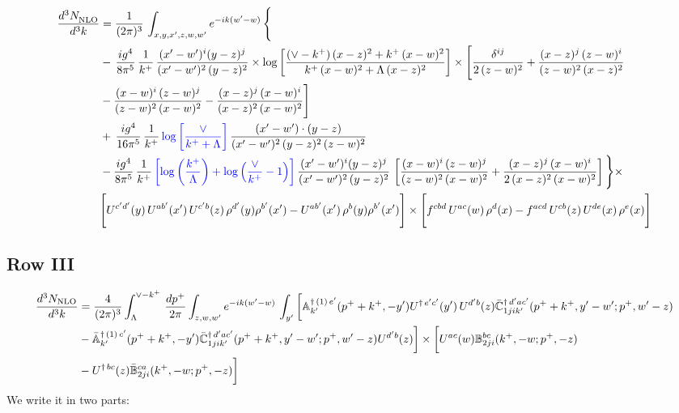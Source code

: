 \documentclass[9pt]{article}
\def\mf#1{\mathbb{#1}}
\numberwithin{equation}{section}
\begin{document}
\begin{align}
     \frac{d^{3}N_{\rm NLO}^{\rm}}{d^{3}k}  & =  \frac{1}{(2\pi)^{3}}\, \int_{x,y,x',z,w,w^{\prime}} e^{-ik(w^{\prime}-w)}\, \Bigg\{\notag \\ & -\,\frac{ig^{4}}{8\pi^{5}}\,\frac{1}{k^{+}}\,\frac{(x'-w')^{i}(y-z)^{j}}{(x'-w')^{2}\,(y-z)^{2}}\times \log{\left[\frac{(\vee-k^{+})\,(x-z)^{2}+k^{+}\,(x-w)^{2}}{k^{+}\,(x-w)^{2}+\Lambda\, (x-z)^{2}}\right]}\times \Bigg[\frac{\delta^{ij}}{2\,(z-w)^{2}}+\frac{(x-z)^{j}\,(z-w)^{i}}{(z-w)^{2}\,(x-z)^{2}}\notag \\ & -\frac{(x-w)^{i}\,(z-w)^{j}}{(z-w)^{2}\,(x-w)^{2}}-\frac{(x-z)^{j}\,(x-w)^{i}}{(x-z)^{2}\,(x-w)^{2}}\Bigg]\notag \\ & +\,\frac{ig^{4}}{16\pi^{5}}\,\frac{1}{k^{+}}\,{\color{blue}\log{\left[\frac{\vee}{k^{+}+\Lambda}\right]}}\, \frac{(x'-w')\cdot (y-z)}{(x'-w')^{2}\,(y-z)^{2}\,(z-w)^{2}}\notag \\ & -\frac{ig^{4}}{8\pi^{5}}\,\frac{1}{k^{+}}\,{\color{blue}\left[\log{\left(\frac{k^{+}}{\Lambda}\right)}+\log{\left(\frac{\vee}{k^{+}}-1\right)}\right]}\,\frac{(x'-w')^{i}(y-z)^{j}}{(x'-w')^{2}\,(y-z)^{2}}\,\left[\frac{(x-w)^{i}\,(z-w)^{j}}{(z-w)^{2}\,(x-w)^{2}}+\frac{(x-z)^{j}\,(x-w)^{i}}{2\,(x-z)^{2}\, (x-w)^{2}}\right]\Bigg\}\times \notag \\ & \Bigg[U^{c'd'}(y)\,U^{ab'}(x')\,U^{c'b}(z)\,\rho^{d'}(y)\rho^{b'}(x')-U^{ab'}(x')\,\rho^{b}(y)\rho^{b'}(x')\Bigg]\times\Bigg[f^{cbd}\,U^{ac}(w)\,\rho^{d}(x)-f^{acd}\, U^{cb}(z)\,U^{de}(x)\,\rho^{e}(x)\Bigg]
\end{align}
 \subsection{Row III\,}
 \begin{align}
    \frac{d^{3}N_{\rm NLO}}{d^{3}k} & =   \frac{4}{(2\pi)^{3}} \int_{\Lambda}^{\vee -k^{+}}\, \frac{dp^{+}}{2\pi}\int_{z,w,w^{\prime}} e^{-ik(w^{\prime}-w)}\,\int_{y^{\prime}}\bigg[\mf{A}^{\dagger\, (1)\,e^{\prime}}_{k^{\prime}}(p^{+}+k^{+},-y^{\prime})U^{\dagger\, e^{\prime}c^{\prime}}(y^{\prime})\,U^{d^{\prime}b}(z) \Bar{\mf{C}}^{\dagger\, d^{\prime}ac^{\prime}}_{1jik^{\prime}}(p^{+}+k^{+},y^{\prime}-w^{\prime}; p^{+},w^{\prime}-z)\notag \\ &  -\Bar{\mf{A}}^{\dagger\, (1)\,c^{\prime}}_{k^{\prime}}(p^{+}+k^{+},-y^{\prime}) \Bar{\mf{C}}^{\dagger\, d^{\prime}ac^{\prime}}_{1jik^{\prime}}(p^{+}+k^{+},y^{\prime}-w^{\prime}; p^{+},w^{\prime}-z)U^{d^{\prime}b}(z)\bigg] \times \bigg[U^{ac}(w) \mf{B}^{bc}_{2ji}(k^{+},-w;p^{+},-z)\notag \\ &  -U^{\dagger\, bc}(z)\Bar{\mf{B}}^{ca}_{2ji}(k^{+},-w; p^{+},-z)\bigg]\nonumber
\end{align}
We write it in two parts:
\end{document}
